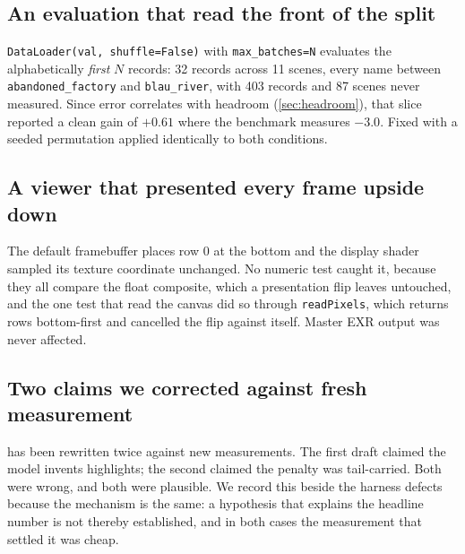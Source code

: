 \subsection{An evaluation that read the front of the split}
\label{sec:front-of-split}

\texttt{DataLoader(val, shuffle=False)} with \texttt{max\_batches=N} evaluates
the alphabetically \emph{first} $N$ records: 32 records across 11 scenes, every
name between \texttt{abandoned\_factory} and \texttt{blau\_river}, with 403
records and 87 scenes never measured. Since error correlates with headroom
(\cref{sec:headroom}), that slice reported a clean gain of $+0.61$ where the
benchmark measures $-3.0$. Fixed with a seeded permutation applied identically
to both conditions.

\subsection{A viewer that presented every frame upside down}
\label{sec:flip}

The default framebuffer places row 0 at the bottom and the display shader
sampled its texture coordinate unchanged. No numeric test caught it, because
they all compare the float composite, which a presentation flip leaves
untouched, and the one test that read the canvas did so through
\texttt{readPixels}, which returns rows bottom-first and cancelled the flip
against itself. Master EXR output was never affected.

\subsection{Two claims we corrected against fresh measurement}
\label{sec:corrections}

 has been rewritten twice against new measurements. The first
draft claimed the model invents highlights; the second claimed the penalty was
tail-carried. Both were wrong, and both were plausible. We record this beside
the harness defects because the mechanism is the same: a hypothesis that
explains the headline number is not thereby established, and in both cases the
measurement that settled it was cheap.
